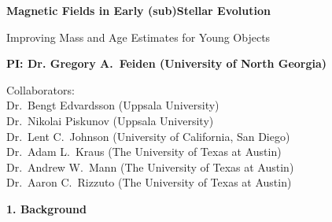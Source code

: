 \documentclass[12pt,letter]{article}
\begin{document}
\thispagestyle{empty}


\begin{center}
	{\bf {\Large Magnetic Fields in Early (sub)Stellar Evolution}
	
	{\large Improving Mass and Age Estimates for Young Objects}}
\end{center}

\begin{center}
	{\bf PI: Dr. Gregory A.~Feiden (University of North Georgia)} 
	
	Collaborators: \\
	Dr.~Bengt Edvardsson (Uppsala University) \\
	Dr.~Nikolai Piskunov (Uppsala University) \\
	Dr.~Lent C.~Johnson (University of California, San Diego) \\
	Dr.~Adam L.~Kraus (The University of Texas at Austin) \\
	Dr.~Andrew W.~Mann (The University of Texas at Austin) \\
	Dr.~Aaron C.~Rizzuto (The University of Texas at Austin) \\
\end{center}

\tableofcontents

\clearpage

{\bf\large 1. Background}  







\clearpage


%

\clearpage



\clearpage



\clearpage


\end{document}
